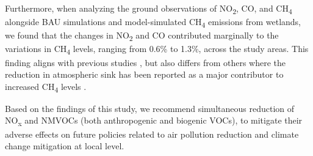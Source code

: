 Furthermore, when analyzing the ground observations of NO\textsubscript{2}, CO, and CH\textsubscript{4} alongside BAU simulations and model-simulated CH\textsubscript{4} emissions from wetlands, we found that the changes in NO\textsubscript{2} and CO contributed marginally to the variations in CH\textsubscript{4} levels, ranging from 0.6\% to 1.3\%, across the study areas. This finding aligns with previous studies \citep{akimoto2022rethinking,qu2022attribution,feng2023methane}, but also differs from others where the reduction in atmospheric sink has been reported as a major contributor to increased CH\textsubscript{4} levels \citep{stevenson2022covid,peng2022wetland}.\par
Based on the findings of this study, we recommend simultaneous reduction of NO\textsubscript{x} and NMVOCs (both anthropogenic and biogenic VOCs), to mitigate their adverse effects on future policies related to air pollution reduction and climate change mitigation at local level. \par
